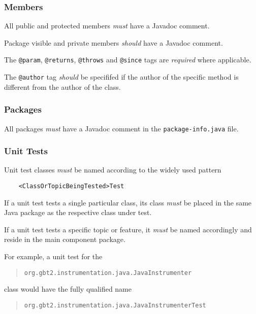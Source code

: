 \documentclass[a4paper,12pt,liststotoc,DIV12]{scrartcl}
\begin{document}
\subsubsection{Members}
All public and protected members \emph{must} have a Javadoc
comment.

Package visible and private members \emph{should} have a Javadoc comment.

The \texttt{@param}, \texttt{@returns}, \texttt{@throws} and \texttt{@since}
tags are \emph{required} where applicable.

The \texttt{@author} tag \emph{should} be specififed if the author of the
specific method is different from the author of the class.

\subsubsection{Packages}
\label{sec:general:javadoc:packages}

All packages \emph{must} have a Javadoc comment in the
\texttt{package-info.java} file.

\subsubsection{Unit Tests}
\label{sec:unit-tests}

Unit test classes \emph{must} be named according to the widely used
pattern

\begin{verbatim}
    <ClassOrTopicBeingTested>Test
\end{verbatim}

If a unit test tests a single particular class, its class \emph{must}
be placed in the same Java package as the respective class under test.

If a unit test tests a specific topic or feature, it \emph{must} be named
accordingly and reside in the main component package.

For example, a unit test for the

\begin{quote}
  \texttt{org.gbt2.instrumentation.java.JavaInstrumenter}
\end{quote}

class would
have the fully qualified name

\begin{quote}
  \texttt{org.gbt2.instrumentation.java.JavaInstrumenterTest}
\end{quote}
\end{document}
